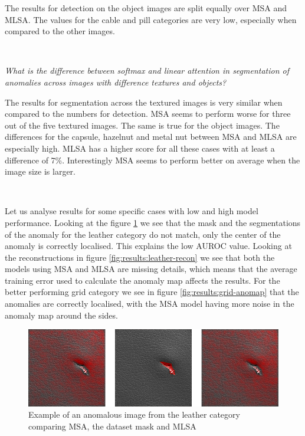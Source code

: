 The results for detection on the object images are split equally over MSA and MLSA. The values for the cable and pill categories are very low, especially when compared to the other images. 

\

\textsl{What is the difference between softmax and linear attention in segmentation of anomalies across images with difference textures and objects?}

The results for segmentation across the textured images is very similar when compared to the numbers for detection. MSA seems to perform worse for three out of the five textured images. The same is true for the object images. The differences for the capsule, hazelnut and metal nut between MSA and MLSA are especially high. MLSA has a higher score for all these cases with at least a difference of 7\%. Interestingly MSA seems to perform better on average when the image size is larger.

\

Let us analyse results for some specific cases with low and high model performance. Looking at the figure \ref{fig:results:leather-anomap} we see that the mask and the segmentations of the anomaly for the leather category do not match, only the center of the anomaly is correctly localised. This explains the low AUROC value. Looking at the reconstructions in figure \ref{fig:results:leather-recon} we see that both the models using MSA and MLSA are missing details, which means that the average training error used to calculate the anomaly map affects the results. For the better performing grid category we see in figure \ref{fig:results:grid-anomap} that the anomalies are correctly localised, with the MSA model having more noise in the anomaly map around the sides.

\begin{figure}[ht!]
\centering
\includegraphics[width=\textwidth]{imgs/samples/leather_cut_anomap.jpg}
\caption{Example of an anomalous image from the leather category comparing MSA, the dataset mask and MLSA}
\label{fig:results:leather-anomap}
\end{figure}

